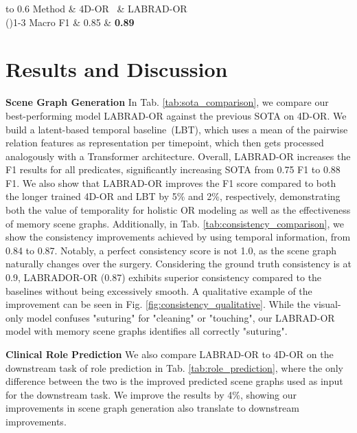 \documentclass[runningheads]{llncs}
\begin{document}
\begin{table}[t]
    \centering
    \caption{Comparison of LABRAD-OR and 4D-OR on the downstream task of role prediction.}
    \begin{tabu} to 0.6\textwidth { X[c] | X[c] X[c] }
    \toprule
     Method & 4D-OR~\cite{ozsoy20224d} & LABRAD-OR \\ 
        \cmidrule(){1-3}
		 Macro F1 & 0.85 & \textbf{0.89}  \\
   \bottomrule
   \end{tabu}
    \label{tab:role_prediction}
\end{table}

\section{Results and Discussion}
\noindent\textbf{Scene Graph Generation}
In Tab. \ref{tab:sota_comparison}, we compare our best-performing model LABRAD-OR against the previous SOTA on 4D-OR. We build a latent-based temporal baseline~(LBT), which uses a mean of the pairwise relation features as representation per timepoint, which then gets processed analogously with a Transformer architecture. Overall, LABRAD-OR increases the F1 results for all predicates, significantly increasing SOTA from 0.75 F1 to 0.88 F1. We also show that LABRAD-OR improves the F1 score compared to both the longer trained 4D-OR and LBT by 5\% and 2\%, respectively, demonstrating both the value of temporality for holistic OR modeling as well as the effectiveness of memory scene graphs. Additionally, in Tab. \ref{tab:consistency_comparison}, we show the consistency improvements achieved by using temporal information, from 0.84 to 0.87. Notably, a perfect consistency score is not 1.0, as the scene graph naturally changes over the surgery. Considering the ground truth consistency is at 0.9, LABRADOR-OR (0.87) exhibits superior consistency compared to the baselines without being excessively smooth. A qualitative example of the improvement can be seen in Fig. \ref{fig:consistency_qualitative}. While the visual-only model confuses "suturing" for "cleaning" or "touching", our LABRAD-OR model with memory scene graphs identifies all correctly "suturing". 

\noindent\textbf{Clinical Role Prediction}
We also compare LABRAD-OR to 4D-OR on the downstream task of role prediction in Tab. \ref{tab:role_prediction}, where the only difference between the two is the improved predicted scene graphs used as input for the downstream task. We improve the results by 4\%, showing our improvements in scene graph generation also translate to downstream improvements. 
\end{document}
